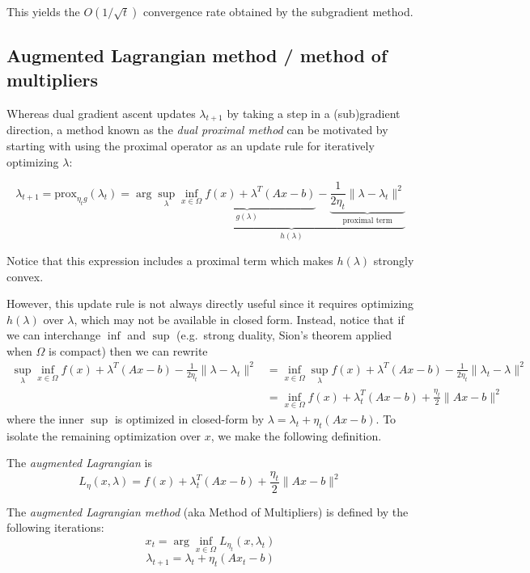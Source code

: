 This yields the $O(1/\sqrt{t})$ convergence rate obtained by the
subgradient method.

\subsection{Augmented Lagrangian method / method of multipliers}

Whereas dual gradient ascent updates $\lambda_{t+1}$ by taking a step
in a (sub)gradient direction, a method known as the \emph{dual proximal
method} can be motivated by starting with using the proximal operator \cite{parikh2014proximal}
as an update rule for iteratively optimizing $\lambda$:

\[
\lambda_{t+1}
= \mathrm{prox}_{\eta_t g}(\lambda_t)
 = \arg\sup_{\lambda} \underbrace{\underbrace{\inf_{x \in \Omega} f(x) + \lambda^T (A x - b)}_{g(\lambda)} - \underbrace{\frac{1}{2 \eta_t} \|\lambda - \lambda_t\|^2}_{\text{proximal term}}}_{h(\lambda)}
\]

Notice that this expression includes a proximal term which makes
$h(\lambda)$ strongly convex.

However, this update rule is not always directly useful since it requires
optimizing $h(\lambda)$ over $\lambda$, which may not be available
in closed form. Instead, notice that if we can interchange $\inf$ and
$\sup$ (e.g.~strong duality, Sion's theorem applied when $\Omega$ is
compact) then we can rewrite
\begin{align}
\sup_{\lambda} \inf_{x \in \Omega} f(x) + \lambda^T(A x - b) - \frac{1}{2 \eta_t} \|\lambda - \lambda_t\|^2 &= \inf_{x \in \Omega} \sup_\lambda f(x) + \lambda^T(A x - b) - \frac{1}{2\eta_t} \|\lambda_t - \lambda\|^2 \\
&= \inf_{x \in \Omega} f(x) + \lambda_t^T (A x - b) + \frac{\eta_t}{2}\|A x - b\|^2
\end{align}
where the inner $\sup$ is optimized in closed-form by
$\lambda = \lambda_t + \eta_t(A x - b)$. To isolate the remaining
optimization over $x$, we make the following definition.

\begin{definition}
The \emph{augmented Lagrangian} is
\[L_\eta(x,\lambda) = f(x) + \lambda_t^T (A x - b) + \frac{\eta_t}{2}\|A x - b\|^2\]
\end{definition}

The \emph{augmented Lagrangian method} (aka Method of Multipliers) is
defined by the following iterations:
\[
x_t = \arg\inf_{x \in \Omega} L_{\eta_t} (x, \lambda_t)
\]
\[
\lambda_{t+1} = \lambda_t + \eta_t (A x_t - b)
\]

